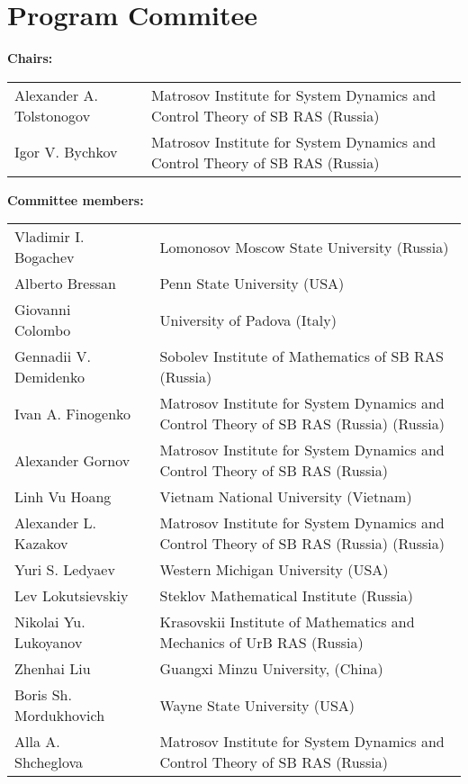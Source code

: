\documentclass[12pt,final]{llncs}
\begin{document}
%
\vspace{-1em}
\section*{Program Commitee}
 \begin{english}

\textbf{Chairs:   }

\begin{tabular}{@{}p{6cm}@{}p{10cm}@{}}
  Alexander A. Tolstonogov &   Matrosov
Institute for System Dynamics and Control Theory of SB RAS (Russia)\\
Igor V. Bychkov &   Matrosov
Institute for System Dynamics and Control Theory of SB RAS (Russia)
\end{tabular}

\noindent\textbf{Committee members:}

\begin{tabular}{@{}p{5.5cm}@{}p{0.5cm}@{}p{10cm}@{}}
Vladimir I. Bogachev & & Lomonosov Moscow State University  (Russia)\\[0.5em]
Alberto Bressan && Penn State University (USA) \\[0.5em]
Giovanni Colombo && University of Padova (Italy)\\[0.5em]
Gennadii V. Demidenko &&  Sobolev Institute of Mathematics of SB RAS (Russia)\\[0.5em]
Ivan A. Finogenko &&  Matrosov  Institute for System Dynamics and Control Theory of SB RAS (Russia)  (Russia)\\[0.5em]
Alexander Gornov && Matrosov  Institute for System Dynamics and Control Theory of SB RAS (Russia) \\[0.5em]
Linh Vu Hoang && Vietnam National University (Vietnam)\\[0.5em]
Alexander L. Kazakov &&  Matrosov  Institute for System Dynamics and Control Theory of SB RAS (Russia) (Russia)\\[0.5em]
Yuri S. Ledyaev && Western Michigan University  (USA)	\\[0.5em]
Lev Lokutsievskiy && Steklov Mathematical Institute (Russia)\\[0.5em]
Nikolai Yu. Lukoyanov &&  Krasovskii Institute of Mathematics and Mechanics of UrB RAS (Russia)\\[0.5em]
Zhenhai Liu && Guangxi Minzu University, (China)\\[0.5em]
Boris Sh. Mordukhovich &&  Wayne State University  (USA)\\[0.5em]
Alla A. Shcheglova &&  Matrosov  Institute for System Dynamics and Control Theory of SB RAS (Russia)\\[0.5em]
\end{tabular}
\end{english}
\end{document}
